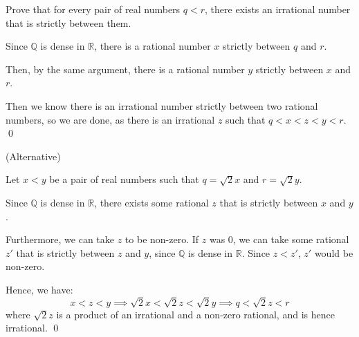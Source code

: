 \documentclass[a4paper, 11pt]{exam}
\newcommand{\solbox}[1]{\begin{EnvFullwidth}\begin{solution}#1\end{solution}\end{EnvFullwidth}}
\begin{document}
\begin{questions}
\clearpage
\question[3] Prove that for every pair of real numbers \(q<r\), there exists an irrational number that is strictly between them.
\solbox{
Since \(\mathbb{Q}\) is dense in \(\mathbb{R}\), there is a rational number \(x\) strictly between \(q\) and \(r\).

Then, by the same argument, there is a rational number \(y\) strictly between \(x\) and \(r\).

Then we know there is an irrational number strictly between two rational numbers, so we are done, as there is an irrational \(z\) such that \(q<x<z<y<r\). \qed
}
\solbox{
(Alternative)

Let \(x<y\) be a pair of real numbers such that \(q=\sqrt{2}x\) and \(r=\sqrt{2}y\).

Since \(\mathbb{Q}\) is dense in \(\mathbb{R}\), there exists some rational \(z\) that is strictly between \(x\) and \(y\).

Furthermore, we can take \(z\) to be non-zero. If \(z\) was \(0\), we can take some rational \(z'\) that is strictly between \(z\) and \(y\), since \(\mathbb{Q}\) is dense in \(\mathbb{R}\). Since \(z<z'\), \(z'\) would be non-zero.

Hence, we have:
\[x<z<y\implies\sqrt{2}x<\sqrt{2}z<\sqrt{2}y\implies q<\sqrt{2}z<r
\]
where \(\sqrt{2}z\) is a product of an irrational and a non-zero rational, and is hence irrational. \qed
}
\end{questions}
\end{document}
